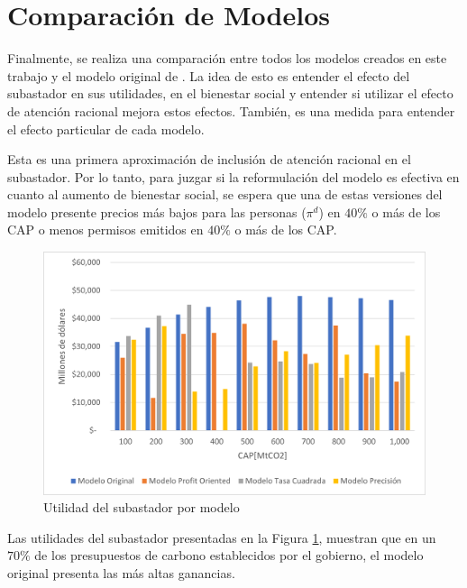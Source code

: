 \section{Comparación de Modelos}

Finalmente, se realiza una comparación entre todos los modelos creados en este trabajo y el modelo original de . La idea de esto es entender el efecto del subastador en sus utilidades,  en el bienestar social y entender si utilizar el efecto de atención racional mejora estos efectos. También, es una medida para entender el efecto particular de cada modelo. 
\vspace{2.5mm}

Esta es una primera aproximación de inclusión de atención racional en el subastador. Por lo tanto, para juzgar si la reformulación del modelo es efectiva en cuanto al aumento de bienestar social, se espera que una de estas versiones del modelo presente precios más bajos para las personas ($\pi^d$) en $40\%$ o más de los CAP o menos permisos emitidos en $40\%$ o más de los CAP.
\vspace{2.5mm}



\begin{figure}[H]
    \centering
    \includegraphics[width=12cm]{docs/DocumentoMemoria/core/images/utilidad de todos lo modelos.png}
    \caption{Utilidad del subastador por modelo }
    \label{utilidades}
\end{figure}

Las utilidades del subastador presentadas en la Figura \ref{utilidades}, muestran que en un $70\%$ de los presupuestos de carbono establecidos por el gobierno, el modelo original presenta las más altas ganancias. 
\vspace{2.5mm}

